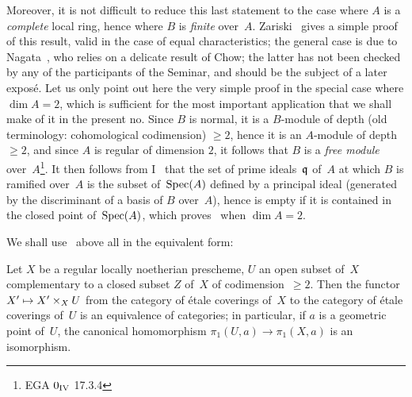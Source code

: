 Moreover, it is not difficult to reduce this last
statement to the case where $A$ is a \emph{complete} local ring,
hence where $B$ is \emph{finite} over~$A$. Zariski~\cite{X.5} gives a
simple proof of this result, valid in the case
of equal characteristics; the general case is due
to Nagata~\cite{X.3}, who relies on a delicate result of
Chow; the latter has not been checked by any of the
participants of the Seminar, and should be the subject of a
later expos\'e. Let us only point out here the
very simple proof in the special case where $\dim A=2$, which is
sufficient for the most important application that we shall make of it
in the present no. Since $B$ is normal, it is a
$B$-module of depth (old terminology: cohomological
codimension) $\ge 2$, hence it is an $A$-module of depth~$\ge
2$, and since $A$ is regular of dimension $2$, it follows
that $B$ is a \emph{free module} over~$A$\kern1pt\footnote{\Cf EGA $0_{\textup{IV}}$
17.3.4}. It then follows from I~ that the set
of prime ideals~$\mathfrak{q}$ of~$A$ at which $B$ is
ramified over~$A$ is the subset of~$\operatorname{Spec}(A)$ defined by a
principal ideal (generated by the discriminant of a basis of
$B$ over~$A$), hence is empty if it is contained in the closed
point of~$\operatorname{Spec}(A)$, which proves~ when $\dim A=2$.

We shall use~ above all in the equivalent form:

\begin{corollary}
\label{X.3.3}
Let $X$ be a regular locally noetherian
prescheme, $U$ an open subset of~$X$ complementary
to a closed subset $Z$ of~$X$ of codimension~$\ge 2$. Then the
functor $X'\mto X'\times_X U$ from the category of
\'etale coverings of~$X$ to the category of
\'etale coverings of~$U$ is an equivalence
of categories; in particular, if $a$ is a
geometric point of~$U$, the canonical homomorphism $\pi_1(U,a)\to
\pi_1(X,a)$ is an isomorphism.
\end{corollary}

